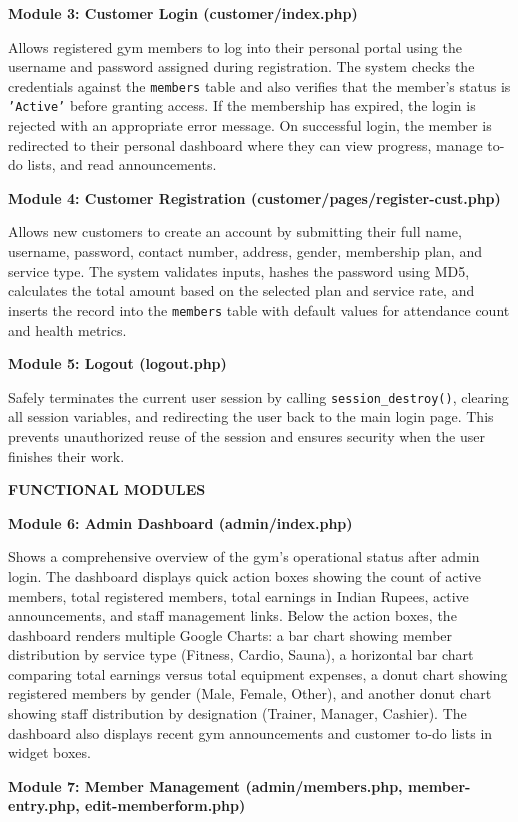\documentclass[12pt,a4paper]{report}
\begin{document}
\textbf{Module 3: Customer Login (customer/index.php)}

Allows registered gym members to log into their personal portal using the username and password assigned during registration. The system checks the credentials against the \texttt{members} table and also verifies that the member's status is \texttt{'Active'} before granting access. If the membership has expired, the login is rejected with an appropriate error message. On successful login, the member is redirected to their personal dashboard where they can view progress, manage to-do lists, and read announcements.

\textbf{Module 4: Customer Registration (customer/pages/register-cust.php)}

Allows new customers to create an account by submitting their full name, username, password, contact number, address, gender, membership plan, and service type. The system validates inputs, hashes the password using MD5, calculates the total amount based on the selected plan and service rate, and inserts the record into the \texttt{members} table with default values for attendance count and health metrics.

\textbf{Module 5: Logout (logout.php)}

Safely terminates the current user session by calling \texttt{session\_destroy()}, clearing all session variables, and redirecting the user back to the main login page. This prevents unauthorized reuse of the session and ensures security when the user finishes their work.

\textbf{FUNCTIONAL MODULES}

\textbf{Module 6: Admin Dashboard (admin/index.php)}

Shows a comprehensive overview of the gym's operational status after admin login. The dashboard displays quick action boxes showing the count of active members, total registered members, total earnings in Indian Rupees, active announcements, and staff management links. Below the action boxes, the dashboard renders multiple Google Charts: a bar chart showing member distribution by service type (Fitness, Cardio, Sauna), a horizontal bar chart comparing total earnings versus total equipment expenses, a donut chart showing registered members by gender (Male, Female, Other), and another donut chart showing staff distribution by designation (Trainer, Manager, Cashier). The dashboard also displays recent gym announcements and customer to-do lists in widget boxes.

\textbf{Module 7: Member Management (admin/members.php, member-entry.php, edit-memberform.php)}
\end{document}
